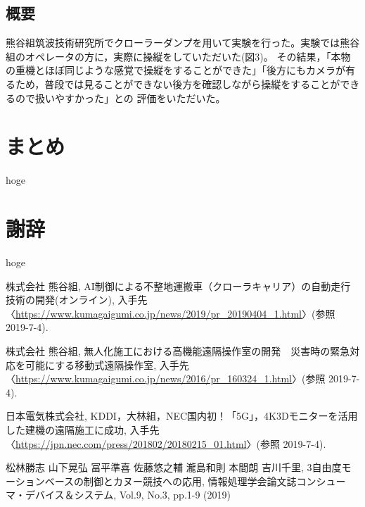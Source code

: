 \documentclass[a4paper,12pt]{jsarticle}
\begin{document}
\subsection{概要}
熊谷組筑波技術研究所でクローラーダンプを用いて実験を行った。実験では熊谷組のオペレータの方に，実際に操縦をしていただいた(図3)。 その結果，「本物の重機とほぼ同じような感覚で操縦をすることができた」「後方にもカメラが有るため，普段では見ることができない後方を確認しながら操縦をすることができるので扱いやすかった」との 評価をいただいた。

\clearpage

\section{まとめ}
hoge

\clearpage

\section*{謝辞} %
hoge

\clearpage

\begin{flushleft} %
\begin{thebibliography}{9} %

株式会社 熊谷組, AI制御による不整地運搬車（クローラキャリア）の自動走行技術の開発(オンライン), 入手先〈\url{https://www.kumagaigumi.co.jp/news/2019/pr_20190404_1.html}〉(参照 2019-7-4).

株式会社 熊谷組, 無人化施工における高機能遠隔操作室の開発　災害時の緊急対応を可能にする移動式遠隔操作室, 入手先〈\url{https://www.kumagaigumi.co.jp/news/2016/pr_160324_1.html}〉(参照 2019-7-4).

日本電気株式会社, KDDI，大林組，NEC国内初！「5G」，4K3Dモニターを活用した建機の遠隔施工に成功, 入手先〈\url{https://jpn.nec.com/press/201802/20180215_01.html}〉(参照 2019-7-4).

松林勝志 山下晃弘 冨平準喜 佐藤悠之輔 瀧島和則 本間朗 吉川千里, 3自由度モーションベースの制御とカヌー競技への応用, 情報処理学会論文誌コンシューマ・デバイス＆システム, Vol.9, No.3, pp.1-9 (2019)

\end{thebibliography}
\end{flushleft}
\end{document}
